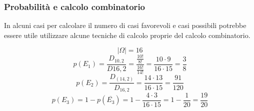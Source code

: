 \documentclass{article}     %
\begin{document}
        \subsubsection{Probabilità e calcolo combinatorio}
            In alcuni casi per calcolare il numero di casi favorevoli e casi possibili potrebbe essere utile utilizzare alcune tecniche di calcolo proprie del calcolo combinatorio.
            \begin{ex}
            

            \[|\Omega|=16\]
            \[p(E_1)=\frac{D_{10,2}}{D{16,2}}=\frac{\frac{10!}{8!}}{\frac{16!}{14!}}=\frac{10\cdot9}{16\cdot15}=\frac{3}{8}\]
            \[p(E_2)=\frac{D_(14,2)}{D_{16,2}}=\frac{14\cdot13}{16\cdot15}=\frac{91}{120}\]
            \[p(E_3)=1-p(\overline{E_3})=1-\frac{4\cdot3}{16\cdot15}=1-\frac{1}{20}=\frac{19}{20}\]
            \end{ex}
\end{document}
